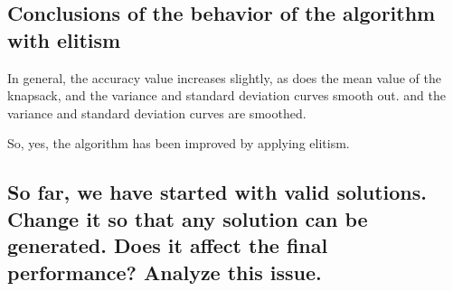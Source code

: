 \documentclass{article}
\begin{document}
    \subsection{Conclusions of the behavior of the algorithm with elitism}

    In general, the accuracy value increases slightly, as does the mean value of the knapsack, and the variance and standard deviation curves smooth out.
    and the variance and standard deviation curves are smoothed.
    
    So, yes, the algorithm has been improved by applying elitism.

    \subsection{So far, we have started with valid solutions. Change it so that any solution can be
    generated. Does it affect the final performance? Analyze this issue.}
\end{document}
